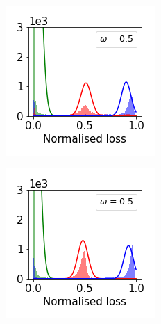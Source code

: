 \documentclass[11pt]{article}
\begin{document}
\begin{figure}[t]
\begin{subfigure}{.18\textwidth}
  \end{subfigure}
  \\
  \begin{subfigure}{.18\textwidth}
    \centering
    \includegraphics[width=\linewidth]{images/loss_dist/EDM_0.6_0.50_cifar100.png} 
  \end{subfigure}
  \begin{subfigure}{.18\textwidth}
    \centering
    \includegraphics[width=\linewidth]{images/loss_dist/EDM_0.6_0.50_imagenet32.png} 

\end{subfigure}
\end{figure}
\end{document}
